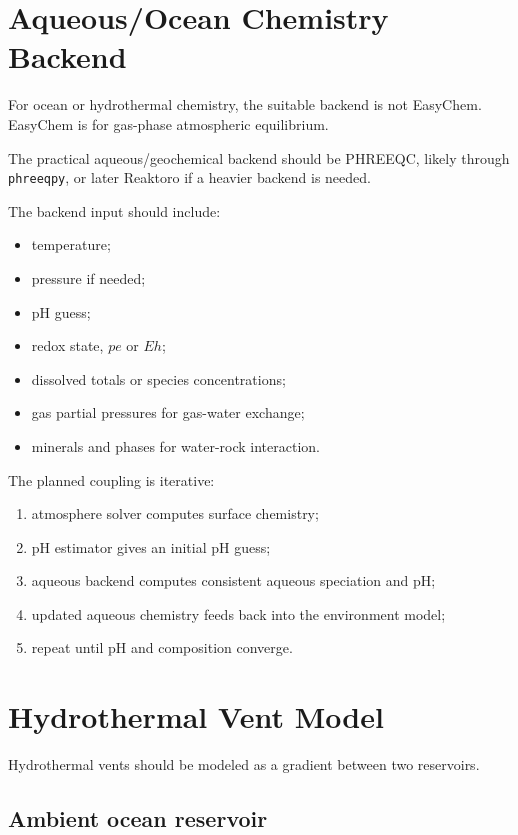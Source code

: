 \documentclass[11pt]{article}
\begin{document}
\section{Aqueous/Ocean Chemistry Backend}

For ocean or hydrothermal chemistry, the suitable backend is not EasyChem.
EasyChem is for gas-phase atmospheric equilibrium.

The practical aqueous/geochemical backend should be PHREEQC, likely through
\texttt{phreeqpy}, or later Reaktoro if a heavier backend is needed.

The backend input should include:

\begin{itemize}
  \item temperature;
  \item pressure if needed;
  \item pH guess;
  \item redox state, \(pe\) or \(Eh\);
  \item dissolved totals or species concentrations;
  \item gas partial pressures for gas-water exchange;
  \item minerals and phases for water-rock interaction.
\end{itemize}

The planned coupling is iterative:

\begin{enumerate}
  \item atmosphere solver computes surface chemistry;
  \item pH estimator gives an initial pH guess;
  \item aqueous backend computes consistent aqueous speciation and pH;
  \item updated aqueous chemistry feeds back into the environment model;
  \item repeat until pH and composition converge.
\end{enumerate}

\section{Hydrothermal Vent Model}

Hydrothermal vents should be modeled as a gradient between two reservoirs.

\subsection{Ambient ocean reservoir}
\end{document}
